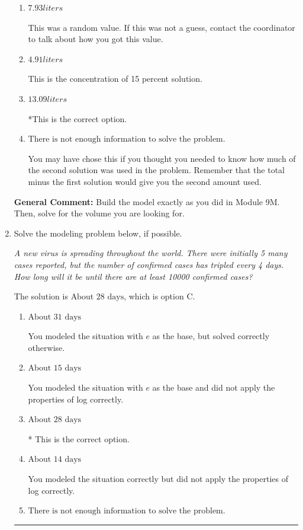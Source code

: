 \documentclass{extbook}[14pt]
\newcommand{\litem}[1]{\item #1

\rule{\textwidth}{0.4pt}}
\begin{document}
\begin{enumerate}
{\begin{enumerate}[label=\Alph*.]
This would be correct if Brittany used equal parts of each solution.
\item \( 7.93 liters \)

This was a random value. If this was not a guess, contact the coordinator to talk about how you got this value.
\item \( 4.91 liters \)

This is the concentration of 15 percent solution.
\item \( 13.09 liters \)

*This is the correct option.
\item \( \text{There is not enough information to solve the problem.} \)

You may have chose this if you thought you needed to know how much of the second solution was used in the problem. Remember that the total minus the first solution would give you the second amount used.
\end{enumerate}

\textbf{General Comment:} Build the model exactly as you did in Module 9M. Then, solve for the volume you are looking for.
}
\litem{
Solve the modeling problem below, if possible.

\begin{center}
    \textit{ A new virus is spreading throughout the world. There were initially 5 many cases reported, but the number of confirmed cases has tripled every 4 days. How long will it be until there are at least 10000 confirmed cases? }
\end{center}
The solution is \( \text{About } 28 \text{ days} \), which is option C.\begin{enumerate}[label=\Alph*.]
\item \( \text{About } 31 \text{ days} \)

You modeled the situation with $e$ as the base, but solved correctly otherwise.
\item \( \text{About } 15 \text{ days} \)

You modeled the situation with $e$ as the base and did not apply the properties of log correctly.
\item \( \text{About } 28 \text{ days} \)

* This is the correct option.
\item \( \text{About } 14 \text{ days} \)

You modeled the situation correctly but did not apply the properties of log correctly.
\item \( \text{There is not enough information to solve the problem.} \)


\end{enumerate}}
\end{enumerate}
\end{document}
